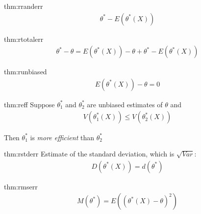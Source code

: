 \begin{theo}{thm:rranderr}
  \begin{equation*}
    \begin{gathered}
      \theta^*-E(\theta^*(X))
    \end{gathered}
  \end{equation*}
\end{theo}
\par\bigskip
\begin{theo}{thm:rtotalerr}
  \begin{equation*}
    \begin{gathered}
      \theta^*-\theta = E(\theta^*(X))-\theta + \theta^*-E(\theta^*(X))
    \end{gathered}
  \end{equation*}
\end{theo}
\par\bigskip
\begin{theo}{thm:runbiased}
  \begin{equation*}
    \begin{gathered}
      E(\theta^*(X))-\theta = 0
    \end{gathered}
  \end{equation*}
\end{theo}
\newpage
\begin{theo}[Efficiency]{thm:reff}
  Suppose $\theta_1^*$ and $\theta_2^*$ are unbiased estimates of $\theta$ and
  \begin{equation*}
    \begin{gathered}
      V(\theta_1^*(X))\leq V(\theta_2^*(X))
    \end{gathered}
  \end{equation*}
  \par\bigskip
  \noindent Then $\theta_1^*$ is \textit{more efficient} than $\theta_2^*$
\end{theo}
\par\bigskip
\begin{theo}{thm:rstderr}
  Estimate of the standard deviation, which is $\sqrt{Var}$:
  \begin{equation*}
    \begin{gathered}
      D(\theta^*(X)) = d(\theta^*)
    \end{gathered}
  \end{equation*}
\end{theo}
\par\bigskip
\begin{theo}{thm:rmserr}
  \begin{equation*}
    \begin{gathered}
      M(\theta^*) = E((\theta^*(X)-\theta)^2)
    \end{gathered}
  \end{equation*}
\end{theo}
